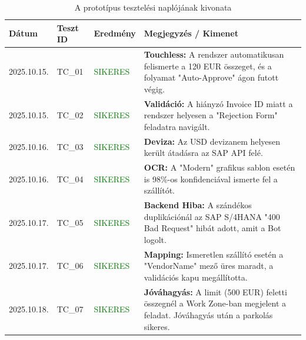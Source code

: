 \begin{table}[H]
    \centering
    \small
    \begin{tabular}{|l|l|l|p{6cm}|}
    \hline
    \textbf{Dátum} & \textbf{Teszt ID} & \textbf{Eredmény} & \textbf{Megjegyzés / Kimenet} \\ \hline
    2025.10.15. & TC\_01 & \textcolor{green}{SIKERES} & \textbf{Touchless:} A rendszer automatikusan felismerte a 120 EUR összeget, és a folyamat "Auto-Approve" ágon futott végig. \\ \hline
    2025.10.15. & TC\_02 & \textcolor{green}{SIKERES} & \textbf{Validáció:} A hiányzó Invoice ID miatt a rendszer helyesen a "Rejection Form" feladatra navigált. \\ \hline
    2025.10.16. & TC\_03 & \textcolor{green}{SIKERES} & \textbf{Deviza:} Az USD devizanem helyesen került átadásra az SAP API felé. \\ \hline
    2025.10.16. & TC\_04 & \textcolor{green}{SIKERES} & \textbf{OCR:} A "Modern" grafikus sablon esetén is 98\%-os konfidenciával ismerte fel a szállítót. \\ \hline
    2025.10.17. & TC\_05 & \textcolor{green}{SIKERES} & \textbf{Backend Hiba:} A szándékos duplikációnál az SAP S/4HANA "400 Bad Request" hibát adott, amit a Bot logolt. \\ \hline
    2025.10.17. & TC\_06 & \textcolor{green}{SIKERES} & \textbf{Mapping:} Ismeretlen szállító esetén a "VendorName" mező üres maradt, a validációs kapu megállította. \\ \hline
    2025.10.18. & TC\_07 & \textcolor{green}{SIKERES} & \textbf{Jóváhagyás:} A limit (500 EUR) feletti összegnél a Work Zone-ban megjelent a feladat. Jóváhagyás után a parkolás sikeres. \\ \hline
    \end{tabular}
    \caption{A prototípus tesztelési naplójának kivonata}
    \label{tab:app_full_test_log}
\end{table}